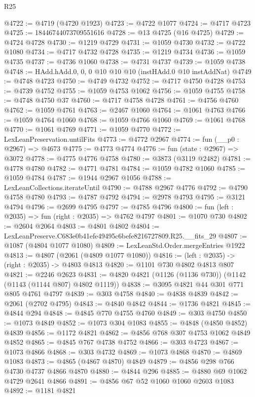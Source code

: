 \begin{lexlean}{R25}
\begin{coremodule}
@4722 := @4719 (@4720 @1923)
@4723 := @4722 @1077
@4724 := @4717 @4723
@4725 := 18446744073709551616
@4728 := @13 @4725 (@16 @4725)
@4729 := @4724 @4728
@4730 := @1219 @4729
@4731 := @1059 @4730
@4732 := @4722 @1080
@4734 := @4717 @4732 @4728
@4735 := @1219 @4734
@4736 := @1059 @4735
@4737 := @4736 @1060
@4738 := @4731 @4737
@4739 := @1059 @4738
@4748 := HAdd.hAdd.{0, 0, 0} @10 @10 @10 (instHAdd.{0} @10 instAddNat)
@4749 := @4748 @4723
@4750 := @4749 @4732
@4752 := @4717 @4750 @4728
@4753 := @4739 @4752
@4755 := @1059 @4753 @1062
@4756 := @1059 @4755
@4758 := @4748 @4750 @37
@4760 := @4717 @4758 @4728
@4761 := @4756 @4760
@4762 := @1059 @4761
@4763 := @2467 @1060
@4764 := @1061 @4763
@4766 := @1059 @4764 @1060
@4768 := @1059 @4766 @1060
@4769 := @1061 @4768
@4770 := @1061 @4769
@4771 := @1059 @4770
@4772 := LexLeanPreservation.untilFits
@4773 := @4772 @2967
@4774 := fun (__p0 : @2967) => @4673
@4775 := @4773 @4774
@4776 := fun (state : @2967) => @3072
@4778 := @4775 @4776 @4758
@4780 := @3873 (@3119 @2482)
@4781 := @4778 @4780
@4782 := @4771 @4781
@4784 := @1059 @4782 @1060
@4785 := @1059 @4784
@4787 := @1944 @2967 @1056
@4788 := LexLeanCollections.iterateUntil
@4790 := @4788 @2967 @4776
@4792 := @4790 @4758 @4780
@4793 := @4787 @4792
@4794 := @2978 @4793
@4795 := @3121 @4794
@4796 := @2699 @4795
@4797 := @4785 @4796
@4800 := fun (left : @2035) => fun (right : @2035) => @4762 @4797
@4801 := @1070 @730
@4802 := @2604 @2064
@4803 := @4801 @4802
@4804 := LexLeanPreserve.C683e0b41efe49495c6befe8216727809.R25.__fits_29
@4807 := @1087 (@4804 @1077 @1080)
@4809 := LexLeanStd.Order.mergeEntries @1922
@4813 := @4807 (@2061 (@4809 @1077 @1080))
@4816 := (left : @2035) -> (right : @2035) -> @4803 @4813
@4820 := @1101 @730 @4802 @4813 @807
@4821 := @2246 @2623
@4831 := @4820 @4821 (@1126 (@1136 @730)) (@1142 (@1143 (@1144 @807) @4802 @1119))
@4838 := @3095 @4821 @44 @301 @771 @805 @4761 @4797
@4839 := @303 @4758
@4840 := @4838 @4839
@4842 := @2061 (@2702 @4795)
@4843 := @4840 @4842
@4844 := @1736 @4821
@4845 := @4844 @294
@4848 := @4845 @770 @4755 @4760
@4849 := @303 @4750
@4850 := @1073 @4849
@4852 := @1073 @304 @1083
@4855 := @4848 (@4850 @4852) @4839
@4856 := @1172 @4821
@4862 := @4856 @768 @307 @4753 @1062 @4849 @4852
@4865 := @4845 @767 @4738 @4752
@4866 := @303 @4723
@4867 := @1073 @4866
@4868 := @303 @4732
@4869 := @1073 @4868
@4870 := @4869 @1083
@4873 := @4865 (@4867 @4870) @4849
@4879 := @4856 @298 @766 @4730 @4737 @4866 @4870
@4880 := @4844 @296
@4885 := @4880 @69 @1062 @4729 @2641 @4866
@4891 := @4856 @67 @52 @1060 @1060 @2603 @1083
@4892 := @1181 @4821

\end{coremodule}
\end{lexlean}

